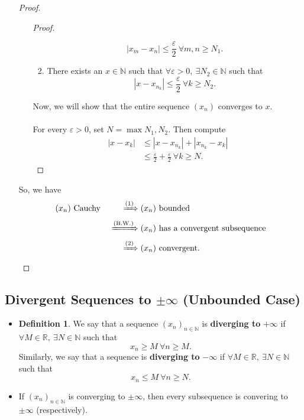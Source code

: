 \documentclass{article}
\newcommand{\R}{\mathbb{R}}
\newcommand{\N}{\mathbb{N}}
\newcommand{\seq}[2]{(#1_{#2})_{#2 \in \N}}
\newcommand{\?}{\stackrel{?}{=}}
\theoremstyle{definition} %
\newtheorem{definition}[subsection]{Definition} %
\begin{document}
\begin{itemize}
\begin{proof}
\begin{enumerate}[label=(\arabic*)]
\begin{proof}
\begin{enumerate}[label=(\roman*)]
                    $$|x_m - x_n| \leq \frac{\varepsilon}{2} \ \forall m, n \geq N_1.$$
                    \item There exists an $x \in \N$ such that $\forall \varepsilon > 0, \ \exists N_2 \in \N$ such that
                    $$|x - x_{n_k}| \leq \frac{\varepsilon}{2} \ \forall k \geq N_2.$$
                \end{enumerate}
                Now, we will show that the entire sequence $(x_n)$ converges to $x$. \\\\
                For every $\varepsilon > 0$, set $N = \max{N_1, N_2}$. Then compute
                \begin{align*}
                    |x - x_k| &\leq |x - x_{n_k}| + |x_{n_k} - x_k| \\
                    &\leq \frac{\varepsilon}{2} + \frac{\varepsilon}{2} \ \forall k \geq N.
                \end{align*}
            \end{proof}
        \end{enumerate}
        So, we have
        \begin{alignat*}{2}
            (x_n) \text{ Cauchy } &&\xRightarrow{\text{(1)}} (x_n) &\text{ bounded } \\
            &&\xRightarrow{\text{(B.W.)}} (x_n) &\text{ has a convergent subsequence} \\
            &&\xRightarrow{\text{(2)}} (x_n) &\text{ convergent}.
        \end{alignat*}
    \end{proof}
\end{itemize}

\subsection{Divergent Sequences to $\pm \infty$ (Unbounded Case)}

\begin{itemize}
    \item[]
    \begin{definition}
        We say that a sequence $\seq{x}{n}$ is \textbf{diverging to} $+\infty$ if $\forall M \in \R, \ \exists N \in \N$ such that
    $$x_n \geq M \ \forall n \geq M.$$
    Similarly, we say that a sequence is \textbf{diverging to} $-\infty$ if $\forall M \in \R, \ \exists N \in \N$ such that
    $$x_n \leq M \ \forall n \geq N.$$
    \end{definition}
    \item[]
    \begin{lemma}
        If $\seq{x}{n}$ is converging to $\pm \infty$, then every subsequence is convering to $\pm \infty$ (respectively).
    \end{lemma}
\end{itemize}
\end{document}
